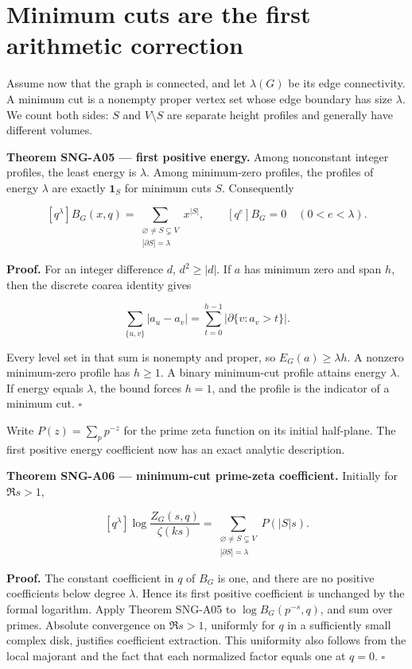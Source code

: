 \documentclass[
  11pt,
  a4paper,
]{report}
\begin{document}
\hypertarget{minimum-cuts-are-the-first-arithmetic-correction}{%
\section{Minimum cuts are the first arithmetic
correction}\label{minimum-cuts-are-the-first-arithmetic-correction}}

Assume now that the graph is connected, and let \(\lambda(G)\) be its
edge connectivity. A minimum cut is a nonempty proper vertex set whose
edge boundary has size \(\lambda\). We count both sides: \(S\) and
\(V\setminus S\) are separate height profiles and generally have
different volumes.

\textbf{Theorem SNG-A05 --- first positive energy.} Among nonconstant
integer profiles, the least energy is \(\lambda\). Among minimum-zero
profiles, the profiles of energy \(\lambda\) are exactly \(\mathbf1_S\)
for minimum cuts \(S\). Consequently

\[
 [q^\lambda]B_G(x,q)=
 \sum_{\substack{\varnothing\ne S\subsetneq V\\|\partial S|=\lambda}}x^{|S|},
 \qquad [q^e]B_G=0\quad(0<e<\lambda).
\]

\textbf{Proof.} For an integer difference \(d\), \(d^2\ge|d|\). If \(a\)
has minimum zero and span \(h\), then the discrete coarea identity gives

\[
 \sum_{\{u,v\}}|a_u-a_v|
 =\sum_{t=0}^{h-1}|\partial\{v:a_v>t\}|.
\]

Every level set in that sum is nonempty and proper, so
\(E_G(a)\ge\lambda h\). A nonzero minimum-zero profile has \(h\ge1\). A
binary minimum-cut profile attains energy \(\lambda\). If energy equals
\(\lambda\), the bound forces \(h=1\), and the profile is the indicator
of a minimum cut. \(\square\)

Write \(P(z)=\sum_pp^{-z}\) for the prime zeta function on its initial
half-plane. The first positive energy coefficient now has an exact
analytic description.

\textbf{Theorem SNG-A06 --- minimum-cut prime-zeta coefficient.}
Initially for \(\Re s>1\),

\[
 [q^\lambda]\log\frac{Z_G(s,q)}{\zeta(ks)}
 =\sum_{\substack{\varnothing\ne S\subsetneq V\\|\partial S|=\lambda}}
 P(|S|s).
\]

\textbf{Proof.} The constant coefficient in \(q\) of \(B_G\) is one, and
there are no positive coefficients below degree \(\lambda\). Hence its
first positive coefficient is unchanged by the formal logarithm. Apply
Theorem SNG-A05 to \(\log B_G(p^{-s},q)\), and sum over primes. Absolute
convergence on \(\Re s>1\), uniformly for \(q\) in a sufficiently small
complex disk, justifies coefficient extraction. This uniformity also
follows from the local majorant and the fact that each normalized factor
equals one at \(q=0\). \(\square\)
\end{document}
